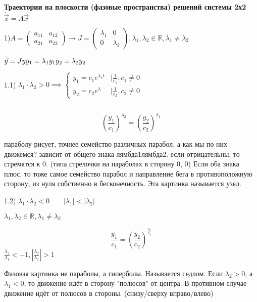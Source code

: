 \documentclass[12pt, a4paper]{article}
\begin{document}
    \par $ $
    \,\\

    \textbf{Траектории на плоскости (фазовые пространства) решений системы
    2х2}
    $\dot{\vec{x}} = A\vec{x}$

    1)$A = \begin{pmatrix}
        a_{11} & a_{12} \\ a_{21} & a_{22}
    \end{pmatrix} \to J = 
    \begin{pmatrix}
        \lambda_1 & 0 \\ 0 & \lambda_2
    \end{pmatrix}, \lambda_1, \lambda_2 \in \mathbb{R}, \lambda_1 \neq \lambda_2$


    $\dot{\vec{y}} = Jy \\ \dot y_1 = \lambda_1 y_1 \\ \dot y_2 = \lambda_2 y_2$

    1.1) $\lambda_1 \cdot \lambda_2 > 0 \implies \begin{cases}
        y_1 = c_1 e^{\lambda_1t} &\mid \frac{1}{c_1}, c_1\neq 0 \\
        y_2 = c_2 e^\lambda &\mid \frac{1}{c_2}, c_2\neq 0
    \end{cases}$

    \par $ $

    $$\left(\frac{y_1}{c_1}\right)^{\lambda_2} = 
    \left( \frac{y_2}{c_2}\right)^{\lambda_1}$$

    параболу рисует, точнее семейство различных парабол. а как мы по них движемся?
    зависит от общего знака лямбда1лямбда2. если отрицательны, то 
    стремятся к 0. (типа стрелочки на параболах в сторону 0, 0)
    Если оба знака плюс, то тоже самое семейство парабол и направление бега 
    в противоположную сторону, из нуля собственно в бесконечность.
    Эта картинка называется узел.

    1.2) $\lambda_1 \cdot \lambda_2 < 0 \qquad |\lambda_1| < |\lambda_2|$
    
    $\lambda_1, \lambda_2 \in \mathbb{R}, \lambda_1 \neq \lambda_2$

    $$\frac{y_1}{c_1} = 
    \left(\frac{y_2}{c_2}\right)^{\frac{\lambda_2}{\lambda_1}}$$
    $\frac{\lambda_2}{\lambda_1} < -1, |\frac{\lambda_2}{\lambda_1}| > 1$

    Фазовая картинка не параболы, а гиперболы. Называется седлом. 
    Если $\lambda_2 > 0$, а $\lambda_1 < 0$, то движение идёт в 
    сторону "полюсов" от центра. В противном случае движение
    идёт от полюсов в стороны.  (снизу/сверху вправо/влево)
\end{document}
